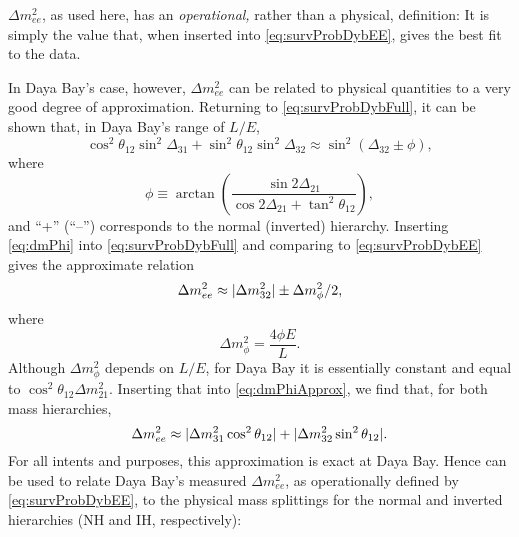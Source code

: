 \documentclass[../thesis.tex]{subfiles}
\begin{document}
\(\Delta m^2_{ee}\), as used here, has an \emph{operational,} rather than a physical, definition: It is simply the value that, when inserted into \autoref{eq:survProbDybEE}, gives the best fit to the data.
%
\begin{comment}
  Note that, if Daya Bay only measured antineutrinos at a single $L/E$, we could instead have made a truly physical definition of $\Delta m^2_{ee}$ by declaring that \[ \sin^2 \Delta_{ee} \equiv \cos^2\theta_{12} \sin^2 \Delta_{31} + \sin^2\theta_{12} \sin^2 \Delta_{32}. \] However, the righthand side of this definition depends on $L/E$, so unless this dependence is shown to be negligible, it cannot be used in broadband analyses such as Daya Bay's.
\end{comment}
%
In Daya Bay's case, however, \(\Delta m^2_{ee}\) can be related to physical quantities to a very good degree of approximation. Returning to \autoref{eq:survProbDybFull}, it can be shown \cite{DocDbDm2ee} that, in Daya Bay's range of $L/E$,
\begin{equation}
  \label{eq:dmPhi}
  \cos^2\theta_{12} \sin^2\Delta_{31} + \sin^2\theta_{12}\sin^2\Delta_{32}
  \approx \sin^2 (\Delta_{32} \pm \phi),
\end{equation}
where
\begin{equation}
  \phi \equiv \arctan\left( \frac{\sin2\Delta_{21}}{\cos2\Delta_{21}+ \tan^2
      \theta_{12}} \right),
\end{equation}
and ``+'' (``--'') corresponds to the normal (inverted) hierarchy. Inserting \autoref{eq:dmPhi} into \autoref{eq:survProbDybFull} and comparing to \autoref{eq:survProbDybEE} gives the approximate relation
\begin{equation}
  \label{eq:dmPhiApprox}
  \Delta m^2_{ee} \approx \lvert \Delta m^2_{32}\rvert \pm \Delta m^2_\phi/2,
\end{equation}
where
\begin{equation}
  \Delta m^2_\phi = \frac{4\phi E}{L}.
\end{equation}
Although $\Delta m^2_\phi$ depends on $L/E$, for Daya Bay it is essentially constant and equal to \(\cos^2\theta_{12}\Delta m^2_{21}\). Inserting that into \autoref{eq:dmPhiApprox}, we find that, for both mass hierarchies,
\begin{equation}
  \label{eq:dmPhysical}
  \Delta m^2_{ee} \approx \lvert \Delta m^2_{31}\cos^2\theta_{12}\rvert + \lvert \Delta m^2_{32}\sin^2\theta_{12}\rvert.
\end{equation}
For all intents and purposes, this approximation is exact at Daya Bay. Hence  can be used to relate Daya Bay's measured \(\Delta m^2_{ee}\), as operationally defined by \autoref{eq:survProbDybEE}, to the physical mass splittings for the normal and inverted hierarchies (NH and IH, respectively):
\end{document}
